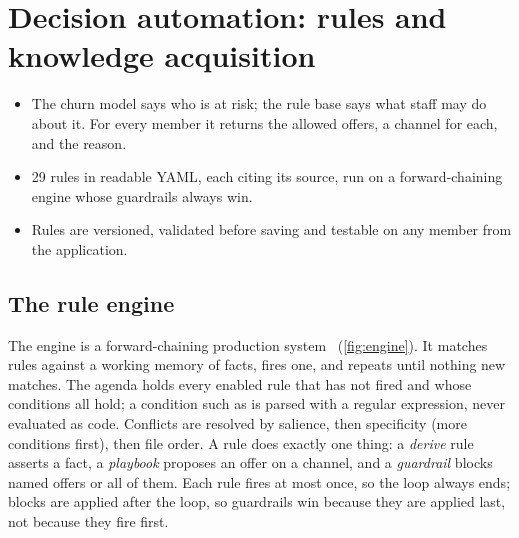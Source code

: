 \chapter{Decision automation: rules and knowledge acquisition}
\label{ch:rules}

\begin{inbrief}
\begin{itemize}
  \item The churn model says who is at risk; the rule base says what staff may do about it. For every member it returns the allowed offers, a channel for each, and the reason.
  \item 29 rules in readable YAML, each citing its source, run on a forward-chaining engine whose guardrails always win.
  \item Rules are versioned, validated before saving and testable on any member from the application.
\end{itemize}
\end{inbrief}

\section{The rule engine}

The engine is a forward-chaining production system~\cite{russell2021aima} (\cref{fig:engine}). It matches rules against a working memory of facts, fires one, and repeats until nothing new matches. The agenda holds every enabled rule that has not fired and whose conditions all hold; a condition such as  is parsed with a regular expression, never evaluated as code. Conflicts are resolved by salience, then specificity (more conditions first), then file order. A rule does exactly one thing: a \emph{derive} rule asserts a fact, a \emph{playbook} proposes an offer on a channel, and a \emph{guardrail} blocks named offers or all of them. Each rule fires at most once, so the loop always ends; blocks are applied after the loop, so guardrails win because they are applied last, not because they fire first.


